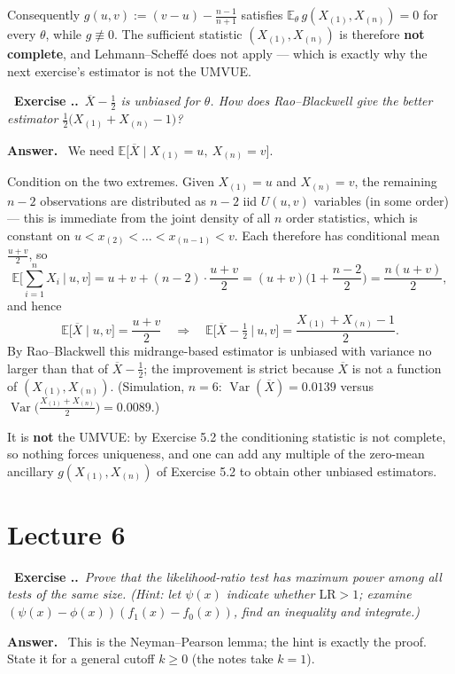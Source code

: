 \documentclass[11pt]{article}
\newcommand{\E}{\mathbb{E}}
\newcommand{\Var}{\operatorname{Var}}
\newcommand{\Xbar}{\overline{X}}
\newcounter{exc}[section]
\newenvironment{exc}[1]{\medskip\refstepcounter{exc}%
  \noindent\textbf{\color{ForestGreen}\raisebox{0.5pt}{\scriptsize$\blacksquare$}\ Exercise \thesection.\theexc.}\ \textit{#1}\par\nopagebreak}{\par}
\newcommand{\ans}{\smallskip\noindent\textbf{Answer.}\ }
\begin{document}
Consequently $g(u,v):=(v-u)-\tfrac{n-1}{n+1}$ satisfies
$\E_\theta\,g(X_{(1)},X_{(n)})=0$ for every $\theta$, while $g\not\equiv0$. The sufficient
statistic $(X_{(1)},X_{(n)})$ is therefore \textbf{not complete}, and Lehmann--Scheff\'e does
not apply --- which is exactly why the next exercise's estimator is not the UMVUE.

\begin{exc}{$\Xbar-\tfrac12$ is unbiased for $\theta$. \emph{How} does Rao--Blackwell give
the better estimator $\tfrac12\big(X_{(1)}+X_{(n)}-1\big)$?}
\end{exc}
\ans
We need $\E\big[\Xbar\mid X_{(1)}=u,\ X_{(n)}=v\big]$.

Condition on the two extremes. Given $X_{(1)}=u$ and $X_{(n)}=v$, the remaining $n-2$
observations are distributed as $n-2$ iid $U(u,v)$ variables (in some order) --- this is
immediate from the joint density of all $n$ order statistics, which is constant on
$u<x_{(2)}<\dots<x_{(n-1)}<v$. Each therefore has conditional mean $\tfrac{u+v}{2}$, so
\[
\E\Big[\sum_{i=1}^n X_i\ \Big|\ u,v\Big]=u+v+(n-2)\cdot\frac{u+v}{2}
=(u+v)\Big(1+\frac{n-2}{2}\Big)=\frac{n(u+v)}{2},
\]
and hence
\[
\E\big[\Xbar\mid u,v\big]=\frac{u+v}{2}
\quad\Longrightarrow\quad
\E\Big[\Xbar-\tfrac12\ \Big|\ u,v\Big]=\frac{X_{(1)}+X_{(n)}-1}{2}.
\]
By Rao--Blackwell this midrange-based estimator is unbiased with variance no larger than that
of $\Xbar-\tfrac12$; the improvement is strict because $\Xbar$ is not a function of
$(X_{(1)},X_{(n)})$. (Simulation, $n=6$: $\Var(\Xbar)=0.0139$ versus
$\Var\big(\tfrac{X_{(1)}+X_{(n)}}{2}\big)=0.0089$.)

It is \textbf{not} the UMVUE: by Exercise 5.2 the conditioning statistic is not complete, so
nothing forces uniqueness, and one can add any multiple of the zero-mean ancillary
$g(X_{(1)},X_{(n)})$ of Exercise 5.2 to obtain other unbiased estimators.

\section{Lecture 6}

\begin{exc}{Prove that the likelihood-ratio test has maximum power among all tests of the
same size. \emph{(Hint: let $\psi(x)$ indicate whether $\mathrm{LR}>1$; examine
$(\psi(x)-\phi(x))(f_1(x)-f_0(x))$, find an inequality and integrate.)}}
\end{exc}
\ans
This is the Neyman--Pearson lemma; the hint is exactly the proof. State it for a general
cutoff $k\ge0$ (the notes take $k=1$).
\end{document}
